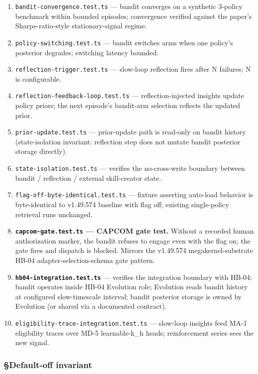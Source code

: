 \documentclass[11pt,letterpaper]{article}
\providecommand{\tightlist}{\setlength{\itemsep}{0pt}\setlength{\parskip}{0pt}}
\begin{document}
\begin{enumerate}
\def\labelenumi{\arabic{enumi}.}
\tightlist
\item
  \texttt{bandit-convergence.test.ts} --- bandit converges on a
  synthetic 3-policy benchmark within bounded episodes; convergence
  verified against the paper's Sharpe-ratio-style stationary-signal
  regime.
\item
  \texttt{policy-switching.test.ts} --- bandit switches arms when one
  policy's posterior degrades; switching latency bounded.
\item
  \texttt{reflection-trigger.test.ts} --- slow-loop reflection fires
  after N failures; N is configurable.
\item
  \texttt{reflection-feedback-loop.test.ts} --- reflection-injected
  insights update policy priors; the next episode's bandit-arm selection
  reflects the updated prior.
\item
  \texttt{prior-update.test.ts} --- prior-update path is read-only on
  bandit history (state-isolation invariant: reflection step does not
  mutate bandit posterior storage directly).
\item
  \texttt{state-isolation.test.ts} --- verifies the no-cross-write
  boundary between bandit / reflection / external skill-creator state.
\item
  \texttt{flag-off-byte-identical.test.ts} --- fixture asserting
  auto-load behavior is byte-identical to v1.49.574 baseline with flag
  off; existing single-policy retrieval runs unchanged.
\item
  \textbf{\texttt{capcom-gate.test.ts} --- CAPCOM gate test.} Without a
  recorded human authorization marker, the bandit refuses to engage even
  with the flag on; the gate fires and dispatch is blocked. Mirrors the
  v1.49.574 megakernel-substrate HB-04 adapter-selection-schema gate
  pattern.
\item
  \textbf{\texttt{hb04-integration.test.ts}} --- verifies the
  integration boundary with HB-04: bandit operates inside HB-04
  Evolution role; Evolution reads bandit history at configured
  slow-timescale interval; bandit posterior storage is owned by
  Evolution (or shared via a documented contract).
\item
  \texttt{eligibility-trace-integration.test.ts} --- slow-loop insights
  feed MA-1 eligibility traces over MD-5 learnable-k\_h heads;
  reinforcement series sees the new signal.
\end{enumerate}

\subsubsection{§Default-off invariant}
\end{document}
